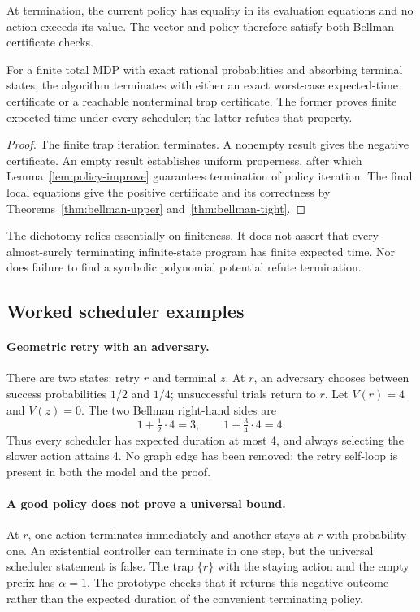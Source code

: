 At termination, the current policy has equality in its evaluation equations and
no action exceeds its value. The vector and policy therefore satisfy both
Bellman certificate checks.

\begin{theorem}
\label{thm:mdp-complete}
For a finite total MDP with exact rational probabilities and absorbing terminal
states, the algorithm terminates with either an exact worst-case expected-time
certificate or a reachable nonterminal trap certificate. The former proves
finite expected time under every scheduler; the latter refutes that property.
\end{theorem}
\begin{proof}
The finite trap iteration terminates. A nonempty result gives the negative
certificate. An empty result establishes uniform properness, after which
Lemma~\ref{lem:policy-improve} guarantees termination of policy iteration.
The final local equations give the positive certificate and its correctness by
Theorems~\ref{thm:bellman-upper} and~\ref{thm:bellman-tight}.
\end{proof}

The dichotomy relies essentially on finiteness. It does not assert that every
almost-surely terminating infinite-state program has finite expected time. Nor
does failure to find a symbolic polynomial potential refute termination.

\subsection{Worked scheduler examples}

\paragraph{Geometric retry with an adversary.}
There are two states: retry $r$ and terminal $z$. At $r$, an adversary chooses
between success probabilities $1/2$ and $1/4$; unsuccessful trials return to
$r$. Let $V(r)=4$ and $V(z)=0$. The two Bellman right-hand sides are
\[
 1+\tfrac12\cdot4=3,\qquad
 1+\tfrac34\cdot4=4.
\]
Thus every scheduler has expected duration at most 4, and always selecting the
slower action attains 4. No graph edge has been removed: the retry self-loop
is present in both the model and the proof.

\paragraph{A good policy does not prove a universal bound.}
At $r$, one action terminates immediately and another stays at $r$ with
probability one. An existential controller can terminate in one step, but the
universal scheduler statement is false. The trap $\{r\}$ with the staying
action and the empty prefix has $\alpha=1$. The prototype checks that it returns
this negative outcome rather than the expected duration of the convenient
terminating policy.

